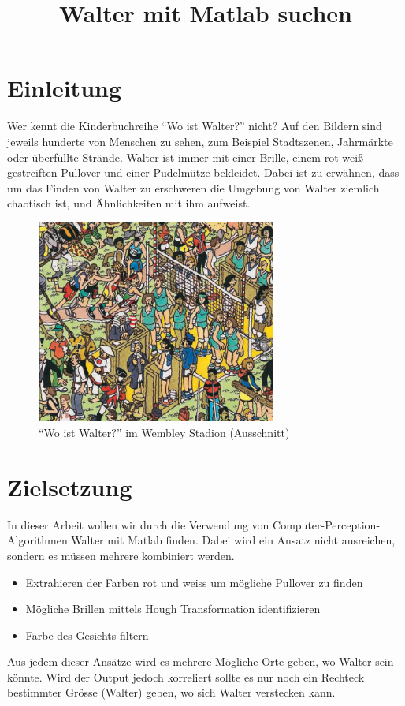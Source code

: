 \documentclass[paper=a4,fontsize=12pt]{scrartcl}
\begin{document}
\title{Walter mit Matlab suchen}
\date{}
\maketitle
\section*{Einleitung}
Wer kennt die Kinderbuchreihe ``Wo ist Walter?'' nicht? Auf den Bildern sind jeweils hunderte von Menschen zu sehen, zum Beispiel Stadtszenen, Jahrmärkte oder überfüllte Strände. Walter ist immer mit einer Brille, einem rot-weiß gestreiften Pullover und einer Pudelmütze bekleidet. Dabei ist zu erwähnen, dass um das Finden von Walter zu erschweren die Umgebung von Walter ziemlich chaotisch ist, und Ähnlichkeiten mit ihm aufweist. 
\begin{figure}[htbp] 
  \centering
     \includegraphics[width=0.7\textwidth]{img/Wally.png}
  \caption{``Wo ist Walter?'' im Wembley Stadion (Ausschnitt)}
  \label{fig:Bild1}
\end{figure}
\section*{Zielsetzung}
In dieser Arbeit wollen wir durch die Verwendung von Computer-Perception-Algorithmen Walter mit Matlab finden. Dabei wird ein Ansatz nicht ausreichen, sondern es müssen mehrere kombiniert werden.
\begin{itemize}
 \item Extrahieren der Farben rot und weiss um mögliche Pullover zu finden
 \item Mögliche Brillen mittels Hough Transformation identifizieren
 \item Farbe des Gesichts filtern
\end{itemize}
Aus jedem dieser Ansätze wird es mehrere Mögliche Orte geben, wo Walter sein könnte. Wird der Output jedoch korreliert sollte es nur noch ein Rechteck bestimmter Grösse (Walter) geben, wo sich Walter verstecken kann. 
\end{document}
